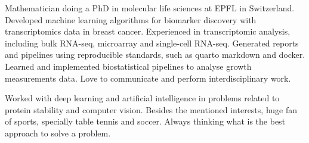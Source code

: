 

\begin{cvparagraph}

Mathematician doing a PhD in molecular life sciences at EPFL in Switzerland. 
Developed machine learning algorithms for biomarker discovery with transcriptomics
data in breast cancer. 
Experienced in transcriptomic analysis, including bulk RNA-seq, microarray
and single-cell RNA-seq. Generated reports and pipelines using
reproducible standards, such as quarto markdown and docker. 
Learned and implemented biostatistical
pipelines to analyse growth measurements data. Love to communicate and
perform interdisciplinary work.

Worked with deep learning and artificial intelligence in problems related
to protein stability and computer vision.
Besides the mentioned interests, huge fan of sports, specially table tennis and soccer.
Always thinking what is the best approach to solve a problem.

\end{cvparagraph}
